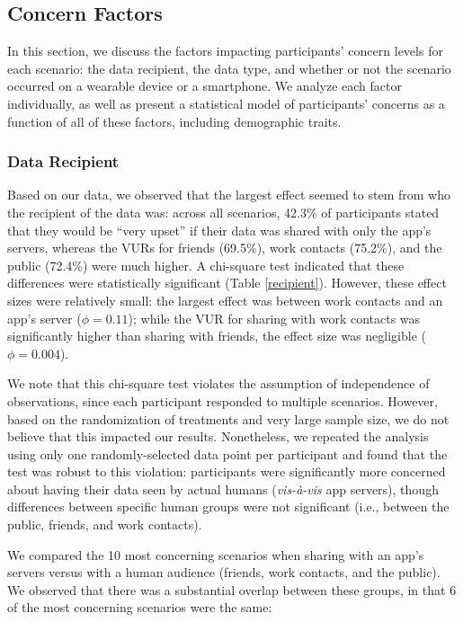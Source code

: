 \documentclass{acm_proc_article-sp}
\begin{document}
\subsection{Concern Factors}
In this section, we discuss the factors impacting participants' concern levels for each scenario: the data recipient, the data type, and whether or not the scenario occurred on a wearable device or a smartphone. We analyze each factor individually, as well as present a statistical model of participants' concerns as a function of all of these factors, including demographic traits.

\subsubsection{Data Recipient}
Based on our data, we observed that the largest effect seemed to stem from who the recipient of the data was: across all scenarios, 42.3\% of participants stated that they would be ``very upset'' if their data was shared with only the app's servers, whereas the VURs for friends (69.5\%), work contacts (75.2\%), and the public (72.4\%) were much higher. A chi-square test indicated that these differences were statistically significant (Table \ref{recipient}). However, these effect sizes were relatively small: the largest effect was between work contacts and an app's server ($\phi=0.11$); while the VUR for sharing with work contacts was significantly higher than sharing with friends, the effect size was negligible ($\phi=0.004$).

We note that this chi-square test violates the assumption of independence of observations, since each participant responded to multiple scenarios. However, based on the randomization of treatments and very large sample size, we do not believe that this impacted our results. Nonetheless, we repeated the analysis using only one randomly-selected data point per participant and found that the test was robust to this violation: participants were significantly more concerned about having their data seen by actual humans ({\it vis-{\`a}-vis} app servers), though differences between specific human groups were not significant (i.e., between the public, friends, and work contacts).


We compared the 10 most concerning scenarios when sharing with an app's servers versus with a human audience (friends, work contacts, and the public). We observed that there was a substantial overlap between these groups, in that 6 of the most concerning scenarios were the same:
\end{document}
